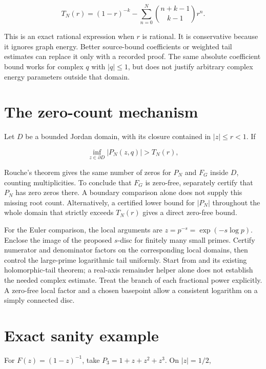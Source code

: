 \documentclass[
  11pt,
  a4paper,
]{report}
\let\nxtexttt\texttt
\renewcommand{\texttt}[1]{\nxtexttt{\seqsplit{#1}}}
\begin{document}
\[
T_N(r)=(1-r)^{-k}-\sum_{n=0}^N\binom{n+k-1}{k-1}r^n.
\]

This is an exact rational expression when \(r\) is rational. It is
conservative because it ignores graph energy. Better source-bound
coefficients or weighted tail estimates can replace it only with a
recorded proof. The same absolute coefficient bound works for complex
\(q\) with \(\lvert q\rvert\le1\), but does not justify arbitrary
complex energy parameters outside that domain.

\hypertarget{the-zero-count-mechanism}{%
\section{The zero-count mechanism}\label{the-zero-count-mechanism}}

Let \(D\) be a bounded Jordan domain, with its closure contained in
\(\lvert z\rvert\le r<1\). If

\[
\inf_{z\in\partial D}\lvert P_N(z,q)\rvert>T_N(r),
\]

Rouche's theorem gives the same number of zeros for \(P_N\) and \(F_G\)
inside \(D\), counting multiplicities. To conclude that \(F_G\) is
zero-free, separately certify that \(P_N\) has zero zeros there. A
boundary comparison alone does not supply this missing root count.
Alternatively, a certified lower bound for \(\lvert P_N\rvert\)
throughout the whole domain that strictly exceeds \(T_N(r)\) gives a
direct zero-free bound.

For the Euler comparison, the local arguments are
\(z=p^{-s}=\exp(-s\log p)\). Enclose the image of the proposed
\(s\)-disc for finitely many small primes. Certify numerator and
denominator factors on the corresponding local domains, then control the
large-prime logarithmic tail uniformly. Start from
\texttt{arithmetic.complex\_disc\_certificate} and its existing
holomorphic-tail theorem; a real-axis remainder helper alone does not
establish the needed complex estimate. Treat the branch of each
fractional power explicitly. A zero-free local factor and a chosen
basepoint allow a consistent logarithm on a simply connected disc.

\hypertarget{exact-sanity-example}{%
\section{Exact sanity example}\label{exact-sanity-example}}

For \(F(z)=(1-z)^{-1}\), take \(P_3=1+z+z^2+z^3\). On
\(\lvert z\rvert=1/2\),
\end{document}
